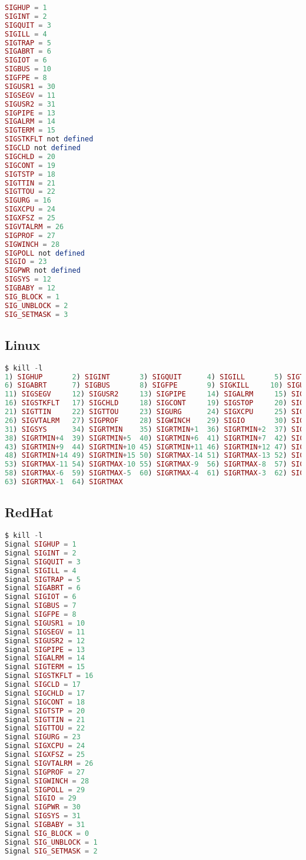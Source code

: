 \begin{lstlisting}[language=PHP]
SIGHUP = 1
SIGINT = 2
SIGQUIT = 3
SIGILL = 4
SIGTRAP = 5
SIGABRT = 6
SIGIOT = 6
SIGBUS = 10
SIGFPE = 8
SIGUSR1 = 30
SIGSEGV = 11
SIGUSR2 = 31
SIGPIPE = 13
SIGALRM = 14
SIGTERM = 15
SIGSTKFLT not defined 
SIGCLD not defined 
SIGCHLD = 20
SIGCONT = 19
SIGTSTP = 18
SIGTTIN = 21
SIGTTOU = 22
SIGURG = 16
SIGXCPU = 24
SIGXFSZ = 25
SIGVTALRM = 26
SIGPROF = 27
SIGWINCH = 28
SIGPOLL not defined 
SIGIO = 23
SIGPWR not defined 
SIGSYS = 12
SIGBABY = 12
SIG_BLOCK = 1
SIG_UNBLOCK = 2
SIG_SETMASK = 3
\end{lstlisting}

\subsection{Linux}



\begin{lstlisting}[language=PHP]
$ kill -l
1) SIGHUP       2) SIGINT       3) SIGQUIT      4) SIGILL       5) SIGTRAP
6) SIGABRT      7) SIGBUS       8) SIGFPE       9) SIGKILL     10) SIGUSR1
11) SIGSEGV     12) SIGUSR2     13) SIGPIPE     14) SIGALRM     15) SIGTERM
16) SIGSTKFLT   17) SIGCHLD     18) SIGCONT     19) SIGSTOP     20) SIGTSTP
21) SIGTTIN     22) SIGTTOU     23) SIGURG      24) SIGXCPU     25) SIGXFSZ
26) SIGVTALRM   27) SIGPROF     28) SIGWINCH    29) SIGIO       30) SIGPWR
31) SIGSYS      34) SIGRTMIN    35) SIGRTMIN+1  36) SIGRTMIN+2  37) SIGRTMIN+3
38) SIGRTMIN+4  39) SIGRTMIN+5  40) SIGRTMIN+6  41) SIGRTMIN+7  42) SIGRTMIN+8
43) SIGRTMIN+9  44) SIGRTMIN+10 45) SIGRTMIN+11 46) SIGRTMIN+12 47) SIGRTMIN+13
48) SIGRTMIN+14 49) SIGRTMIN+15 50) SIGRTMAX-14 51) SIGRTMAX-13 52) SIGRTMAX-12
53) SIGRTMAX-11 54) SIGRTMAX-10 55) SIGRTMAX-9  56) SIGRTMAX-8  57) SIGRTMAX-7
58) SIGRTMAX-6  59) SIGRTMAX-5  60) SIGRTMAX-4  61) SIGRTMAX-3  62) SIGRTMAX-2
63) SIGRTMAX-1  64) SIGRTMAX
\end{lstlisting}


\subsection{RedHat}


\begin{lstlisting}[language=PHP]
$ kill -l
Signal SIGHUP = 1
Signal SIGINT = 2
Signal SIGQUIT = 3
Signal SIGILL = 4
Signal SIGTRAP = 5
Signal SIGABRT = 6
Signal SIGIOT = 6
Signal SIGBUS = 7
Signal SIGFPE = 8
Signal SIGUSR1 = 10
Signal SIGSEGV = 11
Signal SIGUSR2 = 12
Signal SIGPIPE = 13
Signal SIGALRM = 14
Signal SIGTERM = 15
Signal SIGSTKFLT = 16
Signal SIGCLD = 17
Signal SIGCHLD = 17
Signal SIGCONT = 18
Signal SIGTSTP = 20
Signal SIGTTIN = 21
Signal SIGTTOU = 22
Signal SIGURG = 23
Signal SIGXCPU = 24
Signal SIGXFSZ = 25
Signal SIGVTALRM = 26
Signal SIGPROF = 27
Signal SIGWINCH = 28
Signal SIGPOLL = 29
Signal SIGIO = 29
Signal SIGPWR = 30
Signal SIGSYS = 31
Signal SIGBABY = 31
Signal SIG_BLOCK = 0
Signal SIG_UNBLOCK = 1
Signal SIG_SETMASK = 2
\end{lstlisting}


